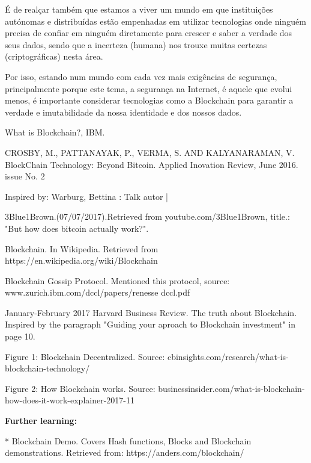 \documentclass{llncs}
\begin{document}
É de realçar também que estamos a viver um mundo em que instituições autónomas e distribuídas estão empenhadas em utilizar tecnologias onde ninguém precisa de confiar em ninguém diretamente para crescer e saber a verdade dos seus dados, sendo que a incerteza (humana) nos trouxe muitas certezas (criptográficas) nesta área. 


    Por isso, estando num mundo com cada vez mais exigências de segurança, principalmente porque este tema, a segurança na Internet, é aquele que evolui menos, é importante considerar tecnologias como a Blockchain para garantir a verdade e imutabilidade da nossa identidade e dos nossos dados.

%


\begin{thebibliography}{1}
What is Blockchain?, IBM.

CROSBY, M., PATTANAYAK, P., VERMA, S. AND KALYANARAMAN, V.
BlockChain Technology: Beyond Bitcoin. Applied Inovation Review, June 2016. issue No. 2

Inspired by: Warburg, Bettina : Talk autor |

3Blue1Brown.(07/07/2017).Retrieved from youtube.com/3Blue1Brown, title.: "But how does bitcoin actually work?".

\bibitem{}
Blockchain. In Wikipedia. Retrieved from https://en.wikipedia.org/wiki/Blockchain

\bibitem{}
Blockchain Gossip Protocol. Mentioned this protocol, source: www.zurich.ibm.com/dccl/papers/renesse dccl.pdf

\bibitem{}
January-February 2017 Harvard Business Review. The truth about Blockchain. Inspired by the paragraph "Guiding your aproach to Blockchain investment" in page 10.

\bibitem{}
Figure 1: Blockchain Decentralized. Source: cbinsights.com/research/what-is-blockchain-technology/

\bibitem{}
Figure 2: How Blockchain works. Source: businessinsider.com/what-is-blockchain-how-does-it-work-explainer-2017-11

\end{thebibliography}

\textbf{Further learning:}
\par
\vspace{0.2cm}
\hspace{0.5cm}* Blockchain Demo. Covers Hash functions, Blocks and Blockchain demonstrations. Retrieved from: https://anders.com/blockchain/
          
            
\end{document}
